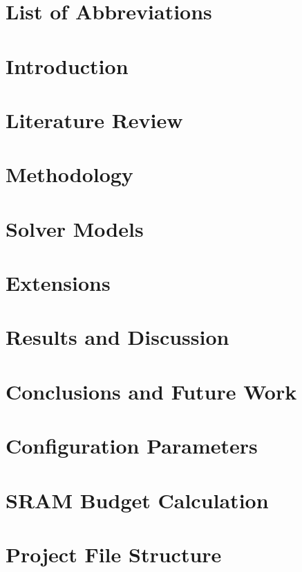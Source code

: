 \documentclass[11pt, a4paper, oneside]{report}
\begin{document}
\tableofcontents
\listoffigures
\listoftables

\chapter*{List of Abbreviations}



\chapter{Introduction}\label{ch:intro}


\chapter{Literature Review}\label{ch:litreview}


\chapter{Methodology}\label{ch:method}


\chapter{Solver Models}\label{ch:model}


\chapter{Extensions}\label{ch:extensions}


\chapter{Results and Discussion}\label{ch:results}


\chapter{Conclusions and Future Work}\label{ch:conclusions}





\appendix
\chapter{Configuration Parameters}\label{app:config}


\chapter{SRAM Budget Calculation}\label{app:sram}


\chapter{Project File Structure}\label{app:files}

\end{document}

